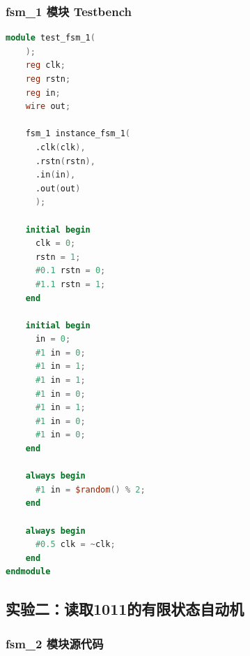 \documentclass[zihao=5, UTF8]{article}
\theoremstyle{MyLineTheoremStyle} %
\theoremstyle{MyBlockTheoremStyle} %
\theoremstyle{MySubsubsectionStyle} %
\begin{document}
\subsubsection{fsm\_1 模块 Testbench}

\begin{lstlisting}[language=Verilog]
module test_fsm_1(
    );
    reg clk;
    reg rstn;
    reg in;
    wire out;

    fsm_1 instance_fsm_1(
      .clk(clk),
      .rstn(rstn),
      .in(in),
      .out(out)
      );

    initial begin
      clk = 0;
      rstn = 1;
      #0.1 rstn = 0;
      #1.1 rstn = 1;
    end

    initial begin
      in = 0;
      #1 in = 0;
      #1 in = 1;
      #1 in = 1;
      #1 in = 0;
      #1 in = 1;
      #1 in = 0;
      #1 in = 0;
    end

    always begin
      #1 in = $random() % 2;
    end

    always begin
      #0.5 clk = ~clk;
    end
endmodule
\end{lstlisting}

\subsection{实验二：读取1011的有限状态自动机}

\subsubsection{fsm\_2 模块源代码}
\end{document}
